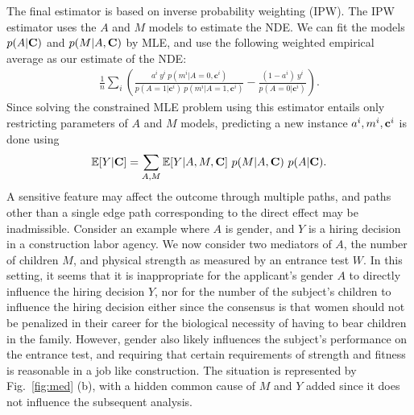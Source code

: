 \documentclass[letterpaper]{article} %
\begin{document}
The final estimator is based on inverse probability weighting (IPW). The IPW estimator uses the $A$ and $M$ models to estimate the NDE. We can fit the models
$p(A | \bf C%
)$ and $p(M | A,\bf C%
)$ by MLE, and use the following weighted empirical average as our estimate of the NDE:
{\small
\begin{align}
\frac{1}{n}  \sum_i
\left(
\frac{
a^i \ y^i \ p(m^i | A = 0, \mathbf{c}^i%
)
}{
p(A = 1 | \mathbf{c}^i %
) \ p(m^i | A = 1,\mathbf{c}^i%
)
}%
- \frac{(1 - a^i) \ y^i}{p(A = 0 | \mathbf{c}^i%
)}
\right).
\label{eqn-IPW}
\end{align}
}
Since solving the constrained MLE problem using this estimator entails only restricting parameters of $A$ and $M$ models, predicting a new instance $a^i,m^i,{\bf c}^i$ is done using
{\small
\begin{align}
\mathbb{E}[Y | {\bf C}%
] = \sum_{A, M} \mathbb{E}[Y | A, M, {\bf C}%
] \ p(M | A, {\bf C}%
) %
\ p(A | {\bf C}%
). %
\label{eqn:y-c}
\end{align}
}
A sensitive feature may affect the outcome through multiple paths, and paths other than a single edge path corresponding to the direct effect may be inadmissible.
Consider an example where $A$ is gender, and $Y$ is a hiring decision in a construction labor agency. We now consider two mediators of $A$, the number of children $M$, and physical strength as measured by an entrance test $W$.  In this setting, it seems that it is inappropriate for the applicant's gender $A$ to directly influence the hiring decision $Y$, nor for the number of the subject's children  to influence the hiring decision either since the consensus is that women should not be penalized in their career for the biological necessity of having to bear children in the family. However, gender also likely influences the subject's performance on the entrance test, and requiring that certain requirements of strength and fitness is reasonable in a job like construction.  The situation is represented by Fig.~\ref{fig:med} (b), with a hidden common cause of $M$ and $Y$ added since it does not influence the subsequent analysis.
\end{document}

